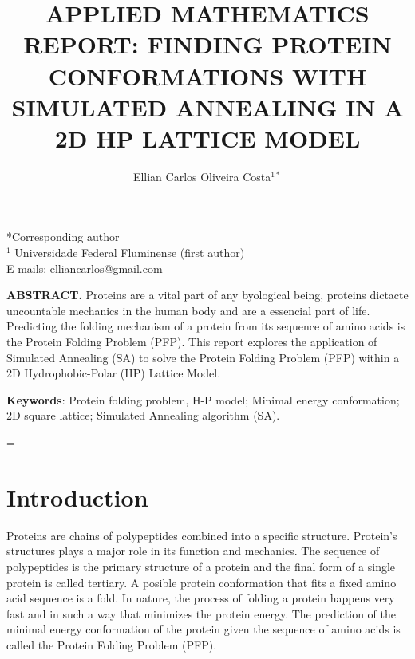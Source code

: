 \documentclass[10pt]{article}
\title{\renewcommand{\baselinestretch}{1.17}\normalsize\bf%
\uppercase{Applied Mathematics Report: Finding Protein Conformations with Simulated Annealing in a 2D HP Lattice Model}
}
\author{%
Ellian Carlos Oliveira Costa$^{1*}$
}
\begin{document}
\date{}

\maketitle

\vspace{-0.5cm}

\begin{center}
{\footnotesize 
*Corresponding author\\
$^1$ Universidade Federal Fluminense (first author) \\
E-mails: elliancarlos@gmail.com
}
\end{center}

\bigskip
\noindent
{\small{\bf ABSTRACT.}
Proteins are a vital part of any byological being, proteins dictacte uncountable mechanics in the human body and are a essencial part of life. Predicting the folding mechanism of a protein from its sequence of amino acids is the Protein Folding Problem (PFP). This report explores the application of Simulated Annealing (SA) to solve the Protein Folding Problem (PFP) within a 2D Hydrophobic-Polar (HP) Lattice Model.}

\medskip
\noindent
{\small{\bf Keywords}{:} Protein folding problem, H-P model; Minimal
energy conformation; 2D square lattice; Simulated
Annealing algorithm (SA).
}

\baselineskip=\normalbaselineskip

\section{Introduction}\label{sec:1}

Proteins are chains of polypeptides combined into a specific structure. Protein's structures plays a major role in its function and mechanics. The sequence of polypeptides is the primary structure of a protein and the final form of a single protein is called tertiary. A posible protein conformation that fits a fixed amino acid sequence is a fold. In nature, the process of folding a protein happens very fast and in such a way that minimizes the protein energy. The prediction of the minimal energy conformation of the protein given the sequence of amino acids is called the Protein Folding Problem (PFP).
\end{document}
